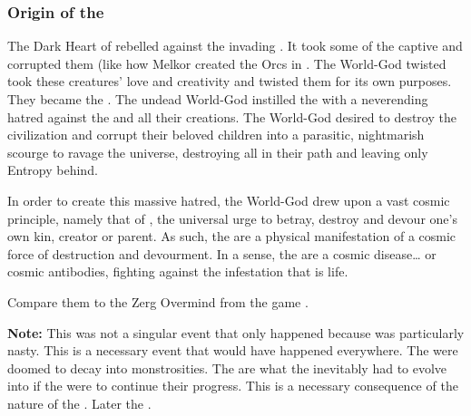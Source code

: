 \subsubsection{Origin of the \banes}
The Dark Heart of \Erebos rebelled against the invading \voyagers.
It took some of the \voyagers captive and corrupted them (like how Melkor created the Orcs in \cite{JRRTolkien:Silmarillion}. 
The World-God twisted took these creatures' love and creativity and twisted them for its own purposes.
They became the \banes. 
The undead World-God instilled the \banes with a neverending hatred against the \voyagers and all their creations. 
The World-God desired to destroy the \psp{\voyagers} civilization and corrupt their beloved children into a parasitic, nightmarish scourge to ravage the universe, destroying all in their path and leaving only Entropy behind. 

In order to create this massive hatred, the World-God drew upon a vast cosmic principle, namely that of , the universal urge to betray, destroy and devour one's own kin, creator or parent. 
As such, the \banes{} are a physical manifestation of a cosmic force of destruction and devourment. 
In a sense, the \banes are a cosmic disease\ldots{} or cosmic antibodies, fighting against the infestation that is life.

Compare them to the Zerg Overmind from the game \cite{VideoGame:Starcraft}. 

\textbf{Note:} 
This was not a singular event that only happened because \Erebos was particularly nasty.
This is a necessary event that would have happened everywhere.
The \voyagers were doomed to decay into monstrosities. 
The \banes are what the \voyagers inevitably had to evolve into if the \voyagers were to continue their progress. 
This is a necessary consequence of the nature of the .
Later the .






